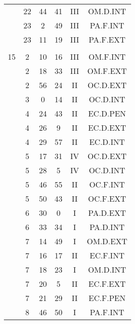 \documentclass[12pt, a4paper]{article}
\begin{document}
\begin{multicols}{3}
{\begin{tabular}{c c c c c c}
	 	 	 	 & 22 & 44 & 41 & III & OM.D.INT\\%
	 	 	 	 & 23 & 2 & 49 & III & PA.F.INT\\%
	 	 	 	 & 23 & 11 & 19 & III & PA.F.EXT\\%
	 	 	 	 & & & & & \\%
	 	 	 	15 & 2 & 10 & 16 & III & OM.F.INT\\%
	 	 	 	 & 2 & 18 & 33 & III & OM.F.EXT\\%
	 	 	 	 & 2 & 56 & 24 & II & OC.D.EXT\\%
	 	 	 	 & 3 & 0 & 14 & II & OC.D.INT\\%
	 	 	 	 & 4 & 24 & 43 & II & EC.D.PEN\\%
	 	 	 	 & 4 & 26 & 9 & II & EC.D.EXT\\%
	 	 	 	 & 4 & 29 & 57 & II & EC.D.INT\\%
	 	 	 	 & 5 & 17 & 31 & IV & OC.D.EXT\\%
	 	 	 	 & 5 & 28 & 5 & IV & OC.D.INT\\%
	 	 	 	 & 5 & 46 & 55 & II & OC.F.INT\\%
	 	 	 	 & 5 & 50 & 43 & II & OC.F.EXT\\%
	 	 	 	 & 6 & 30 & 0 & I & PA.D.EXT\\%
	 	 	 	 & 6 & 33 & 34 & I & PA.D.INT\\%
	 	 	 	 & 7 & 14 & 49 & I & OM.D.EXT\\%
	 	 	 	 & 7 & 16 & 17 & II & EC.F.INT\\%
	 	 	 	 & 7 & 18 & 23 & I & OM.D.INT\\%
	 	 	 	 & 7 & 20 & 5 & II & EC.F.EXT\\%
	 	 	 	 & 7 & 21 & 29 & II & EC.F.PEN\\%
	 	 	 	 & 8 & 46 & 50 & I & PA.F.INT\\%

\end{tabular}}
\end{multicols}
\end{document}
